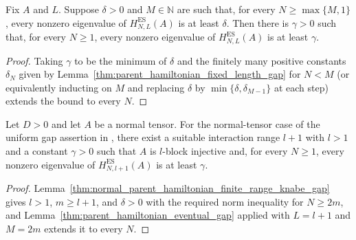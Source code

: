 \begin{lemma}
    \label{thm:parent_hamiltonian_eventual_gap}
    \leanok
    Fix $A$ and $L$. Suppose $\delta>0$ and $M\in\mathbb N$ are such that,
    for every $N\geq\max\{M,1\}$, every nonzero eigenvalue of
    $H_{N,L}^{\mathrm{ES}}(A)$ is at least $\delta$.
    Then there is $\gamma>0$ such that, for every $N\geq1$, every nonzero
    eigenvalue of $H_{N,L}^{\mathrm{ES}}(A)$ is at least $\gamma$.
\end{lemma}

\begin{proof}
    \leanok
    Taking $\gamma$ to be the minimum of $\delta$ and the finitely many
    positive constants $\delta_N$ given by
    Lemma~\ref{thm:parent_hamiltonian_fixed_length_gap} for $N<M$ (or
    equivalently inducting on $M$ and replacing $\delta$ by
    $\min\{\delta,\delta_{M-1}\}$ at each step) extends the bound to every
    $N$.
\end{proof}

\begin{lemma}
    \label{thm:normal_mps_parent_hamiltonian_gap}
    \leanok
    Let $D>0$ and let $A$ be a normal tensor. For the normal-tensor case of
    the uniform gap assertion in \cite[lines~2183--2187]{Cirac2021Matrix},
    there exist a suitable interaction range $l+1$ with $l>1$ and a constant
    $\gamma>0$ such that $A$ is $l$-block injective and, for every
    $N\geq1$, every nonzero eigenvalue of $H_{N,l+1}^{\mathrm{ES}}(A)$ is at
    least $\gamma$.
\end{lemma}

\begin{proof}
    \leanok
    Lemma~\ref{thm:normal_parent_hamiltonian_finite_range_knabe_gap}
    gives $l>1$, $m\geq l+1$, and $\delta>0$ with the required norm
    inequality for $N\geq2m$, and
    Lemma~\ref{thm:parent_hamiltonian_eventual_gap} applied with
    $L=l+1$ and $M=2m$ extends it to every $N$.
\end{proof}

